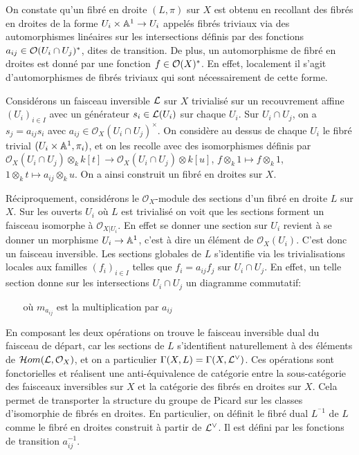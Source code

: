 On constate qu'un fibré en droite $(L,\pi)$ sur $X$ est obtenu en recollant des fibrés en droites de la forme $U_i\times \mathbb{A}^1\rightarrow U_i$ appelés fibrés triviaux via des automorphismes linéaires sur les intersections définis par des fonctions $a_{ij}\in \mathcal{O}(U_i\cap U_j)^*$, dites de transition. De plus, un automorphisme de fibré en droites est donné par une fonction $f\in \mathcal{O}(X)^*$. En effet, localement il s'agit d'automorphismes de fibrés triviaux qui sont nécessairement de cette forme.

Considérons un faisceau inversible $\mathcal{L}$ sur $X$ trivialisé sur un recouvrement affine $(U_i)_{i\in I}$ avec un générateur $s_i\in\mathcal{L}(U_i)$ sur chaque $U_i$. Sur $U_i\cap U_j$, on a $s_j=a_{ij}s_i$ avec $a_{ij} \in \mathcal{O}_X(U_i\cap U_j)^\times$. On considère au dessus de chaque $U_i$ le fibré trivial $(U_i\times\mathbb{A}^1, \pi_i)$, et on les recolle avec des isomorphismes définis par $\mathcal{O}_X(U_i\cap U_j)\otimes_k k[t]\rightarrow \mathcal{O}_X(U_i\cap U_j)\otimes k[u]$, $f\otimes_k 1\mapsto f\otimes_k 1$, $1 \otimes_k t \mapsto a_{ij}\otimes_k u$. On a ainsi construit un fibré en droites sur $X$.

Réciproquement, considérons le $\mathcal{O}_X$-module des sections d'un fibré en droite $L$ sur $X$. Sur les ouverts $U_i$ où $L$ est trivialisé on voit que les sections forment un faisceau isomorphe à $\mathcal{O}_{X|U_i}$. En effet se donner une section sur $U_i$ revient à se donner un morphisme $U_i\rightarrow \mathbb{A}^1$, c'est à dire un élément de $\mathcal{O}_X(U_i)$. C'est donc un faisceau inversible. Les sections globales de $L$ s'identifie via les trivialisations locales aux familles $(f_i)_{i\in I}$ telles que $f_i=a_{ij}f_j$ sur $U_i\cap U_j$. En effet, un telle section donne sur les intersections $U_i\cap U_j$ un diagramme commutatif:

	\begin{center}
	$\,\,\,\,\,\,\,\,\,$ où $m_{a_{ij}}$ est la multiplication par $a_{ij}$ 
	\end{center}

En composant les deux opérations on trouve le faisceau inversible dual du faisceau de départ, car les sections de $L$ s'identifient naturellement à des éléments de $\mathcal{H} om(\mathcal{L},\mathcal{O}_X)$, et on a particulier $\Gamma(X,L)=\Gamma(X,\mathcal{L}^\vee)$. Ces opérations sont fonctorielles et réalisent une anti-équivalence de catégorie entre la sous-catégorie des faisceaux inversibles sur $X$ et la catégorie des fibrés en droites sur $X$. Cela permet de transporter la structure du groupe de Picard sur les classes d'isomorphie de fibrés en droites. En particulier, on définit le fibré dual $L^{^-1}$ de $L$ comme le fibré en droites construit à partir de $\mathcal{L}^\vee$. Il est défini par les fonctions de transition $a_{ij}^{-1}$.

